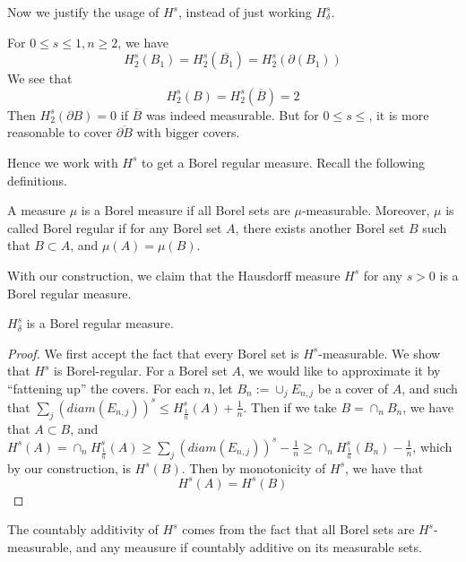 Now we justify the usage of $H^s$, instead of just working $H_\delta^s$.
\begin{exercise}
    For $0\leq s\leq 1, n\geq 2$, we have
    \begin{equation*}
        H_2^s(B_1)=H_2^s(\overline{B_1})=H_2^s(\partial(B_1))
    \end{equation*}
    We see that
    \begin{equation*}
        H_2^s(B)=H_2^s(\overline{B})=2
    \end{equation*}
    Then $H_2^s(\partial B)=0$ if $\overline{B}$ was indeed measurable. But for $0\leq s\leq $, it is more reasonable to cover $\overline{\partial B}$ with bigger covers.
\end{exercise}

Hence we work with $H^s$ to get a Borel regular measure. Recall the following definitions.
\begin{definition}
    A measure $\mu$ is a Borel measure if all Borel sets are $\mu$-measurable. Moreover, $\mu$ is called Borel regular if for any Borel set $A$, there exists another Borel set $B$ such that $B\subset A$, and $\mu(A)=\mu(B)$.
\end{definition}
With our construction, we claim that the Hausdorff measure $H^s$ for any $s>0$ is a Borel regular measure.
\begin{proposition}
    $H_\delta^s$ is a Borel regular measure.
\end{proposition}
\begin{proof}
    We first accept the fact that every Borel set is $H^s$-measurable. We show that $H^s$ is Borel-regular. For a Borel set $A$, we would like to approximate it by ``fattening up'' the covers. For each $n$, let $B_n:=\cup_jE_{n,j}$ be a cover of $A$, and such that $\sum_{j}(diam(E_{n,j}))^s\leq H_\frac{1}{n}^s(A)+\frac{1}{n}$. Then if we take $B=\cap_nB_n$, we have that $A\subset B$, and $H^s(A)=\cap_n H_\frac{1}{n}^s(A)\geq\sum_j(diam(E_{n,j}))^s-\frac{1}{n}\geq \cap_nH_\frac{1}{n}^s(B_n)-\frac{1}{n}$, which by our construction, is $H^s(B)$. Then by monotonicity of $H^s$, we have that
    \begin{equation*}
        H^s(A)=H^s(B)
    \end{equation*}
\end{proof}
\begin{note}
    The countably additivity of $H^s$ comes from the fact that all Borel sets are $H^s$-measurable, and any meausure if countably additive on its measurable sets.
\end{note}

